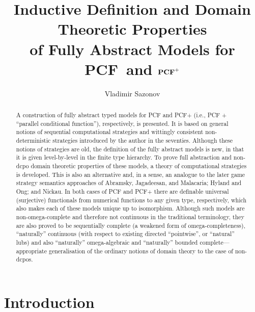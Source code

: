 \documentclass[fleqn]{LMCS}
\theoremstyle{plain}\newtheorem{satz}[thm]{Satz}
\theoremstyle{plain}\newtheorem{hyp}[thm]{Hypothesis}
\theoremstyle{plain}\newtheorem{hyps}[thm]{Hypotheses}
\theoremstyle{definition}\newtheorem{note}[thm]{Note}
\newcommand{\PCF}{\mbox{\bf PCF}}
\newcommand{\?}{\mbox{?}}
\begin{document}
\title[Fully Abstract Models for \PCF\ and $\PCF^+$]{Inductive Definition and 
Domain Theoretic Properties \\
of 
Fully Abstract Models for \PCF\ and $\PCF^+$}

\author[V.~Sazonov]{Vladimir Sazonov}	\address{Department of Computer Science, 
the University of Liverpool, 
Liverpool, L69 3BX, U.K.
}	  







\begin{abstract}
A construction of fully abstract typed models 
for PCF and PCF+ 
(i.e., PCF + ``parallel conditional function''), respectively, is presented. 
It is based on general notions of 
sequential computational strategies and wittingly 
consistent 
non-deterministic strategies
introduced by the author 
in the seventies. 
Although these notions of strategies are old, the definition of the 
fully abstract models is new, in that it 
is given level-by-level in the finite type hierarchy. 
To prove full abstraction and non-dcpo 
domain theoretic properties of these models, 
a theory of computational strategies is developed. 
This is also an alternative and, in a sense, an analogue 
to the later game strategy semantics approaches of 
Abramsky, Jagadeesan, and Malacaria; 
Hyland and Ong; and  Nickau. 
In both cases of PCF and PCF+ 
there are definable universal (surjective) 
functionals from numerical functions to any given type, 
respectively, 
which also makes each of these models unique up to isomorphism. 
Although such models are non-omega-complete and therefore 
not continuous in the traditional terminology, 
they are also proved to be 
sequentially complete 
(a weakened form of omega-completeness), 
``naturally'' continuous 
(with respect to existing directed ``pointwise'', or ``natural'' lubs) 
and also 
``naturally'' omega-algebraic and 
``naturally'' bounded complete---appropriate generalisation 
of the ordinary notions 
of domain theory to the case of non-dcpos. 

\end{abstract}
\maketitle

\section{Introduction}\label{sec-intro}
\end{document}
